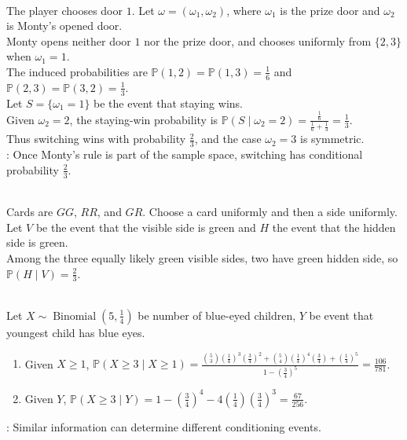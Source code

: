 \begin{example} \label{ex:monty-hall-conditional-sample-space} \\
The player chooses door $1$. Let $\omega=(\omega_1,\omega_2)$, where $\omega_1$ is the prize door and $\omega_2$ is Monty's opened door.\\
Monty opens neither door $1$ nor the prize door, and chooses uniformly from $\{2,3\}$ when $\omega_1=1$.\\
The induced probabilities are $\mathbb{P}(1,2)=\mathbb{P}(1,3)=\frac16$ and $\mathbb{P}(2,3)=\mathbb{P}(3,2)=\frac13$.\\
Let $S=\{\omega_1=1\}$ be the event that staying wins.\\
Given $\omega_2=2$, the staying-win probability is $\mathbb{P}(S\mid \omega_2=2)=\frac{\frac{1}{6}}{\frac{1}{6}+\frac{1}{3}}=\frac13$.\\
Thus switching wins with probability $\frac{2}{3}$, and the case $\omega_2=3$ is symmetric.\\
: Once Monty's rule is part of the sample space, switching has conditional probability $\frac{2}{3}$.
\end{example}

\begin{example} \label{ex:three-card-green-side-problem} \\
Cards are $GG$, $RR$, and $GR$. Choose a card uniformly and then a side uniformly.\\
Let $V$ be the event that the visible side is green and $H$ the event that the hidden side is green.\\
Among the three equally likely green visible sides, two have green hidden side, so $\mathbb{P}(H\mid V)=\frac{2}{3}$.
\end{example}

\begin{example} \label{ex:conditional-blue-eyes-family} \\
Let $X\sim\operatorname{Binomial}(5,\frac{1}{4})$ be number of blue-eyed children, $Y$ be event that youngest child has blue eyes.
\begin{enumerate}[label=(\roman*)]
\setlength{\itemsep}{0pt}
\item Given $X\geq1$, $\mathbb{P}(X\geq3\mid X\geq1) =\frac{\binom53\left(\frac{1}{4}\right)^3\left(\frac{3}{4}\right)^2+\binom54\left(\frac{1}{4}\right)^4\left(\frac{3}{4}\right)+\left(\frac{1}{4}\right)^5}{1-\left(\frac{3}{4}\right)^5} =\frac{106}{781}$.
\item Given $Y$, $\mathbb{P}(X\geq3\mid Y) =1-\left(\frac34\right)^4-4\left(\frac14\right)\left(\frac34\right)^3 =\frac{67}{256}$.
\end{enumerate}
: Similar information can determine different conditioning events.
\end{example}

